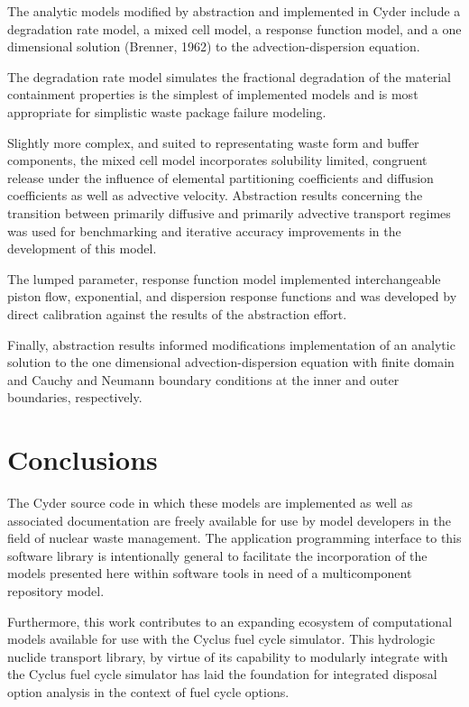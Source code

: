 \documentclass{anstrans}
\begin{document}
The analytic models modified by abstraction and implemented in Cyder include a 
degradation rate model, a mixed cell model, a response function model, and a 
one dimensional solution (Brenner, 1962) to the advection-dispersion equation.

The degradation rate model simulates the fractional degradation of the material 
containment properties is the simplest of implemented models and is most 
appropriate for simplistic waste package failure modeling. 

Slightly more complex, and suited to representating waste form and buffer 
components, the mixed cell model incorporates solubility limited, congruent 
release under the influence of elemental partitioning coefficients and diffusion 
coefficients as well as advective velocity. Abstraction results concerning the 
transition between primarily diffusive and primarily advective transport regimes 
was used for benchmarking and iterative accuracy improvements in the development 
of this model.

The lumped parameter, response function model implemented interchangeable piston flow, 
exponential, and dispersion response functions and was developed by direct 
calibration against the results of the abstraction effort.  

Finally, abstraction results informed modifications implementation of an 
analytic solution to the one dimensional advection-dispersion equation with 
finite domain and Cauchy and Neumann boundary conditions at the inner and outer 
boundaries, respectively. 

\section{Conclusions}
The Cyder source code in which these models are implemented as well as 
associated documentation are freely available for use by model developers in the 
field of nuclear waste management. The application programming interface to this 
software library is intentionally general to facilitate the incorporation of the 
models presented here within software tools in need of a multicomponent repository 
model.

Furthermore, this work contributes to an expanding ecosystem of computational 
models available for use with the Cyclus fuel cycle simulator. This hydrologic 
nuclide transport library, by virtue of its capability to modularly integrate 
with the Cyclus fuel cycle simulator has laid the foundation for integrated 
disposal option analysis in the context of fuel cycle options. 



\end{document}
